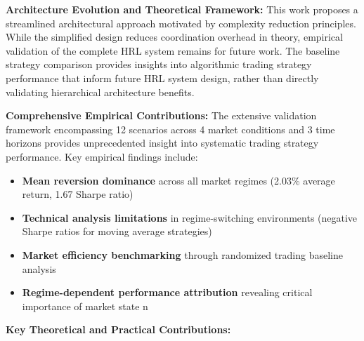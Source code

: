\documentclass[11pt]{article}
\begin{document}
\textbf{Architecture Evolution and Theoretical Framework:}
This work proposes a streamlined architectural approach motivated by complexity reduction principles. While the simplified design reduces coordination overhead in theory, empirical validation of the complete HRL system remains for future work. The baseline strategy comparison provides insights into algorithmic trading strategy performance that inform future HRL system design, rather than directly validating hierarchical architecture benefits.

\textbf{Comprehensive Empirical Contributions:}
The extensive validation framework encompassing 12 scenarios across 4 market conditions and 3 time horizons provides unprecedented insight into systematic trading strategy performance. Key empirical findings include:

\begin{itemize}
\item \textbf{Mean reversion dominance} across all market regimes (2.03\% average return, 1.67 Sharpe ratio)
\item \textbf{Technical analysis limitations} in regime-switching environments (negative Sharpe ratios for moving average strategies)
\item \textbf{Market efficiency benchmarking} through randomized trading baseline analysis
\item \textbf{Regime-dependent performance attribution} revealing critical importance of market state n

\end{itemize}
\textbf{Key Theoretical and Practical Contributions:}
\end{document}
